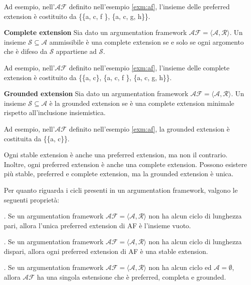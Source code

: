 Ad esempio, nell'$\mathcal{AF}$ definito nell'esempio \ref{exm:af}, l'insieme delle preferred extension è costituito da \{\{a, c, f \}, \{a, c, g, h\}\}.

\bigskip
\begin{defn} \textbf{Complete extension} Sia dato un argumentation framework $\mathcal{AF = ⟨A, R⟩}$. Un insieme $\mathcal{S ⊆ A}$ ammissibile è una complete extension se e solo se ogni argomento che è difeso da $\mathcal{S}$ appartiene ad $\mathcal{S}$.
\end{defn}

Ad esempio, nell'$\mathcal{AF}$ definito nell'esempio \ref{exm:af}, l'insieme delle complete extension è costituito da \{\{a, c\}, \{a, c, f \}, \{a, c, g, h\}\}.

\bigskip
\begin{defn} \textbf{Grounded extension} Sia dato un argumentation framework $\mathcal{AF = ⟨A, R⟩}$. Un insieme $\mathcal{S ⊆ A}$ è la grounded extension se è una complete extension minimale rispetto all'inclusione insiemistica.
\end{defn}

Ad esempio, nell'$\mathcal{AF}$ definito nell'esempio \ref{exm:af}, la grounded extension è costituita da \{\{a, c\}\}.

\bigskip
\begin{prp}Ogni stable extension è anche una preferred extension, ma non il contrario. Inoltre, ogni preferred extension è anche una complete extension. Possono esistere più stable, preferred e complete extension, ma la grounded extension è unica.
\end{prp}

Per quanto riguarda i cicli presenti in un argumentation framework, valgono le seguenti proprietà:

\bigskip
\begin{prp}. Se un argumentation framework $\mathcal{AF = ⟨A,R⟩}$ non ha alcun ciclo di lunghezza pari, allora l’unica preferred extension di AF è l’insieme vuoto.
\end{prp}

\bigskip
\begin{prp}. Se un argumentation framework $\mathcal{AF = ⟨A,R⟩}$ non ha alcun ciclo di lunghezza dispari, allora ogni preferred extension di AF è una stable extension.
\end{prp}

\bigskip
\begin{prp}. Se un argumentation framework $\mathcal{AF = ⟨A,R⟩}$ non ha alcun ciclo ed $\mathcal{A = ∅}$, allora $\mathcal{AF}$ ha una singola estensione che è preferred, completa e grounded.
\end{prp}

